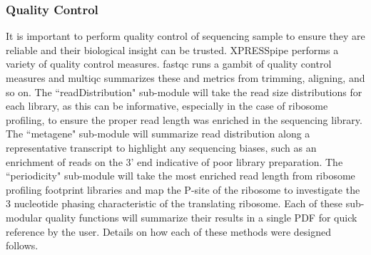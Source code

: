 \documentclass[11pt, a4paper, oneside]{article}
\begin{document}
\subsubsection{Quality Control}
It is important to perform quality control of sequencing sample to ensure they are reliable and their biological insight can be trusted. XPRESSpipe performs a variety of quality control measures. fastqc{} runs a gambit of quality control measures and multiqc summarizes these and metrics from trimming, aligning, and so on. The ``readDistribution" sub-module will take the read size distributions for each library, as this can be informative, especially in the case of ribosome profiling, to ensure the proper read length was enriched in the sequencing library. The ``metagene" sub-module will summarize read distribution along a representative transcript to highlight any sequencing biases, such as an enrichment of reads on the 3' end indicative of poor library preparation. The ``periodicity" sub-module will take the most enriched read length from ribosome profiling footprint libraries and map the P-site of the ribosome to investigate the 3 nucleotide phasing characteristic of the translating ribosome. Each of these sub-modular quality functions will summarize their results in a single PDF for quick reference by the user. Details on how each of these methods were designed follows.
\end{document}
